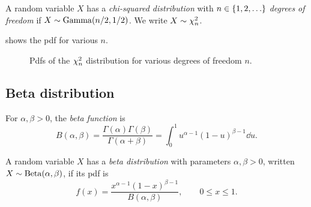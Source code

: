 \begin{definition}\label{def:chi-squared}
A random variable $X$ has a \emph{chi-squared distribution} with $n \in \left\{ 1, 2, \ldots \right\}$ \emph{degrees of freedom} if $X \sim \mathrm{Gamma}(n/2, 1/2)$. We write $X \sim \chi^2_{n}$.
\end{definition}

 shows the pdf for various $n$.

\begin{figure}[H]
\centering
{}
\caption{Pdfs of the $\chi^2_{n}$ distribution for various degrees of freedom $n$.}
\label{fig:chi-squared-pdfs}
\end{figure}


\subsection{Beta distribution}\label{sec:beta}

\begin{definition}\label{def:beta-function}
For $\alpha, \beta > 0$, the \emph{beta function} is
\[
  B(\alpha, \beta) = \frac{\Gamma(\alpha)\Gamma(\beta)}{\Gamma(\alpha + \beta)} = \int_0^1 u^{\alpha - 1} (1 - u)^{\beta - 1} \dd u.
\]
\end{definition}

\begin{definition}\label{def:beta-distribution}
A random variable $X$ has a \emph{beta distribution} with parameters $\alpha, \beta > 0$, written $X \sim \mathrm{Beta}(\alpha, \beta)$, if its pdf is
\[
  f(x) = \frac{x^{\alpha - 1} (1 - x)^{\beta - 1}}{B(\alpha, \beta)}, \qquad 0 \le x \le 1.
\]
\end{definition}

